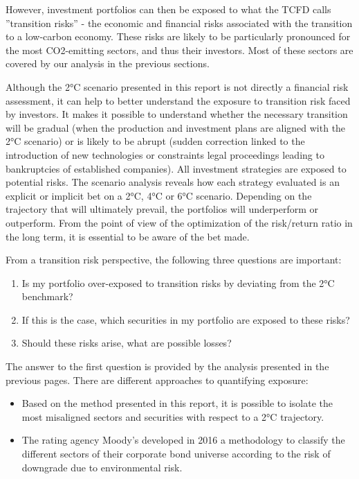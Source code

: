 \documentclass[10pt,twoside,table]{article}\usepackage[]{graphicx}\usepackage[]{color}
\begin{document}
 However, investment portfolios can then be exposed to what the TCFD calls ”transition risks” - the economic and financial risks associated with the transition to a low-carbon economy. These risks are likely to be particularly pronounced for the most CO2-emitting sectors, and thus their investors. Most of these sectors are covered by our analysis in the previous sections. 
 
 Although the 2°C scenario presented in this report is not directly a financial risk assessment, it can help to better understand the exposure to transition risk faced by investors. It makes it possible to understand whether the necessary transition will be gradual (when the production and investment plans are aligned with the 2°C scenario) or is likely to be abrupt (sudden correction linked to the introduction of new technologies or constraints legal proceedings leading to bankruptcies of established companies). All investment strategies are exposed to potential risks. The scenario analysis reveals how each strategy evaluated is an explicit or implicit bet on a 2°C, 4°C or 6°C scenario. Depending on the trajectory that will ultimately prevail, the portfolios will underperform or outperform. From the point of view of the optimization of the risk/return ratio in the long term, it is essential to be aware of the bet made.
 
 From a transition risk perspective, the following three questions are important:
 
 \begin{enumerate}
 	\item{Is my portfolio over-exposed to transition risks by deviating from the 2°C benchmark?}
 	\item{If this is the case, which securities in my portfolio are exposed to these risks?}
 	\item{Should these risks arise, what are possible losses?}
 \end{enumerate}
 
 
 The answer to the first question is provided by the analysis presented in the previous pages. There are different approaches to quantifying exposure:
 
 \begin{itemize}
 	 \item{Based on the method presented in this report, it is possible to isolate the most misaligned sectors and securities with respect to a 2°C trajectory.}
 	
	\item{The rating agency Moody’s developed in 2016 a methodology to classify the different sectors of their corporate bond universe according to the risk of downgrade due to environmental risk.}
 \end{itemize}
 
\end{document}
